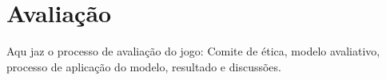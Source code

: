 \chapter{Avaliação}\label{ch:Avaliacao}

Aqu jaz o processo de avaliação do jogo:
Comite de ética, modelo avaliativo, processo de aplicação do modelo, resultado e discussões. 